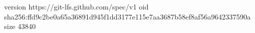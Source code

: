 version https://git-lfs.github.com/spec/v1
oid sha256:ffd9c2be0a65a36891d945f1dd3177e115e7aa3687b58ef8af56a9642337590a
size 43840
